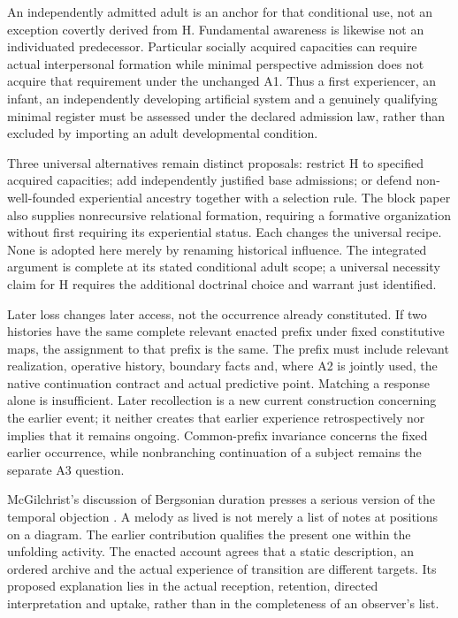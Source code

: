 An independently admitted adult is an anchor for that conditional use, not an exception covertly derived from H. Fundamental awareness is likewise not an individuated predecessor. Particular socially acquired capacities can require actual interpersonal formation while minimal perspective admission does not acquire that requirement under the unchanged A1. Thus a first experiencer, an infant, an independently developing artificial system and a genuinely qualifying minimal register must be assessed under the declared admission law, rather than excluded by importing an adult developmental condition.

Three universal alternatives remain distinct proposals: restrict H to specified acquired capacities; add independently justified base admissions; or defend non-well-founded experiential ancestry together with a selection rule. The block paper also supplies nonrecursive relational formation, requiring a formative organization without first requiring its experiential status. Each changes the universal recipe. None is adopted here merely by renaming historical influence. The integrated argument is complete at its stated conditional adult scope; a universal necessity claim for H requires the additional doctrinal choice and warrant just identified.

Later loss changes later access, not the occurrence already constituted. If two histories have the same complete relevant enacted prefix under fixed constitutive maps, the assignment to that prefix is the same. The prefix must include relevant realization, operative history, boundary facts and, where A2 is jointly used, the native continuation contract and actual predictive point. Matching a response alone is insufficient. Later recollection is a new current construction concerning the earlier event; it neither creates that earlier experience retrospectively nor implies that it remains ongoing. Common-prefix invariance concerns the fixed earlier occurrence, while nonbranching continuation of a subject remains the separate A3 question.

McGilchrist's discussion of Bergsonian duration presses a serious version of the temporal objection \cite[vol.~2, ch.~22, ``Can we avoid the spatialisation of time?'' and ``Time as flowing process only'']{McGilchristMatter2021}. A melody as lived is not merely a list of notes at positions on a diagram. The earlier contribution qualifies the present one within the unfolding activity. The enacted account agrees that a static description, an ordered archive and the actual experience of transition are different targets. Its proposed explanation lies in the actual reception, retention, directed interpretation and uptake, rather than in the completeness of an observer's list.

